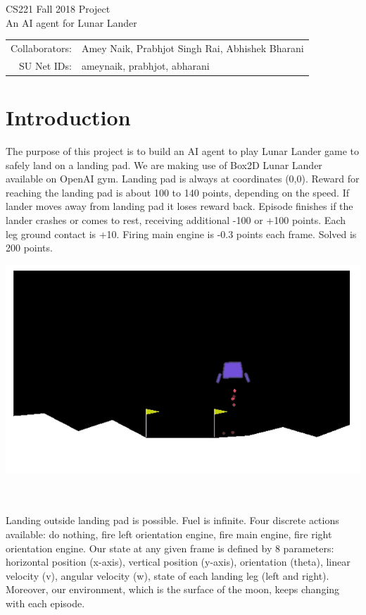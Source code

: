 \documentclass[12pt]{article}
\begin{document}
\begin{center}
{\Large CS221 Fall 2018 Project} \\
{\Large An AI agent for Lunar Lander}

\begin{tabular}{rl}
Collaborators: & Amey Naik, Prabhjot Singh Rai, Abhishek Bharani \\
SU Net IDs: & ameynaik, prabhjot, abharani
\end{tabular}
\end{center}


\section{Introduction}

\noindent\begin{minipage}{0.6\textwidth}
The purpose of this project is to build an AI agent to play Lunar Lander game to safely land on a landing pad. We are making use of Box2D Lunar Lander available on OpenAI gym. Landing pad is always at coordinates (0,0). Reward for reaching the landing pad is about 100 to 140 points, depending on the speed. If lander moves away from landing pad it loses reward back. Episode finishes if the lander crashes or comes to rest, receiving additional -100 or +100 points. Each leg ground contact is +10. Firing main engine is -0.3 points each frame. Solved is 200 points.
\end{minipage}
\begin{minipage}{0.3\textwidth}\raggedleft
\includegraphics[scale=0.3]{LunarLanderDemoImage.png}
\end{minipage}
\\ \\
Landing outside landing pad is possible. Fuel is infinite. Four discrete actions available: do nothing, fire left orientation engine, fire main engine, fire right orientation engine. Our state at any given frame is defined by 8 parameters: horizontal position (x-axis), vertical position (y-axis), orientation (theta), linear velocity (v), angular velocity (w), state of each landing leg (left and right). Moreover, our environment, which is the surface of the moon, keeps changing with each episode.
\end{document}
